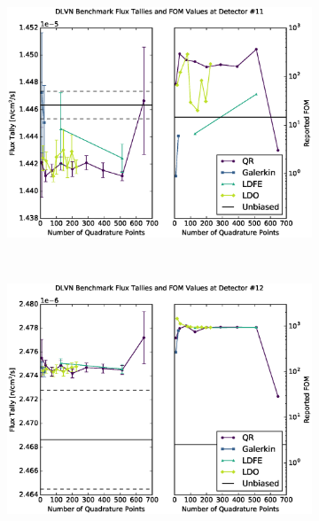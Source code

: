 \documentclass{article} %
\begin{document}
\clearpage
\begin{figure}[!htb]
\ContinuedFloat
\begin{subfigure}{\linewidth}
\centering
\includegraphics[max height=0.445\textheight]
{img/dlvn-fwcadis-11.eps}
\label{dlvn-fwc-11}
\end{subfigure}
\\
\begin{subfigure}{\linewidth}
\centering
\includegraphics[max height=0.445\textheight]
{img/dlvn-fwcadis-12.eps}
\label{dlvn-fwc-12}
\end{subfigure}
\end{figure}
\end{document}
